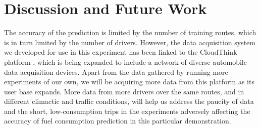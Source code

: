 \section{Discussion and Future Work} \label{sec:future}

The accuracy of the prediction is limited by the number of training routes, which is in turn limited by the number of drivers. However, the data acquisition system we developed for use in this experiment has been linked to the CloudThink platform \cite{CT:WP:2013}, which is being expanded to include a network of diverse automobile data acquisition devices. Apart from the data gathered by running more experiments of our own, we will be acquiring more data from this platform as its user base expands. More data from more drivers over the same routes, and in different climactic and traffic conditions, will help us address the paucity of data and the short, low-consumption trips in the experiments adversely affecting the accuracy of fuel consumption prediction in this particular demonstration.